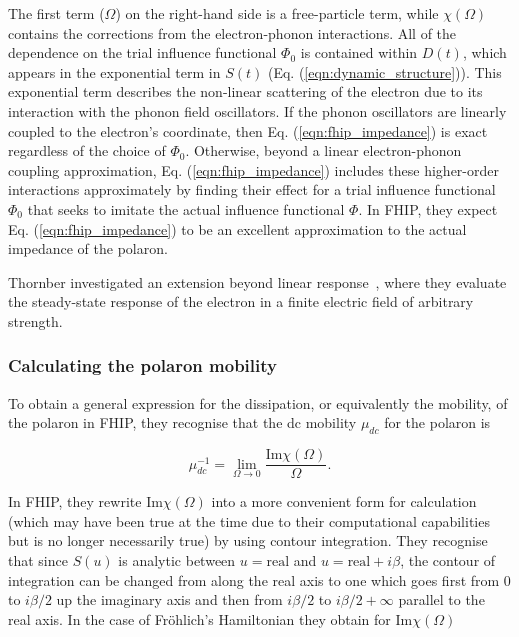 The first term ($\Omega$) on the right-hand side is a free-particle term, while $\chi(\Omega)$ contains the corrections from the electron-phonon interactions. All of the dependence on the trial influence functional $\Phi_0$ is contained within $D(t)$, which appears in the exponential term in $S(t)$ (Eq. (\ref{eqn:dynamic_structure})). This exponential term describes the non-linear scattering of the electron due to its interaction with the phonon field oscillators. If the phonon oscillators are linearly coupled to the electron's coordinate, then Eq. (\ref{eqn:fhip_impedance}) is exact regardless of the choice of $\Phi_0$. Otherwise, beyond a linear electron-phonon coupling approximation, Eq. (\ref{eqn:fhip_impedance}) includes these higher-order interactions approximately by finding their effect for a trial influence functional $\Phi_0$ that seeks to imitate the actual influence functional $\Phi$. In FHIP, they expect Eq. (\ref{eqn:fhip_impedance}) to be an excellent approximation to the actual impedance of the polaron. 

Thornber investigated an extension beyond linear response~\cite{thornber_velocity_1970}, where they evaluate the steady-state response of the electron in a finite electric field of arbitrary strength.

\subsubsection{Calculating the polaron mobility}
\label{subsubsec:2-3-1-4}

To obtain a general expression for the dissipation, or equivalently the mobility, of the polaron in FHIP, they recognise that the dc mobility $\mu_{dc}$ for the polaron is

\begin{equation}\label{eqn:FHIP_mobility}
    \mu^{-1}_{dc} = \lim_{\Omega \rightarrow 0} \frac{\textrm{Im}\chi(\Omega)}{\Omega}.
\end{equation}

In FHIP, they rewrite $\text{Im} \chi(\Omega)$ into a more convenient form for calculation (which may have been true at the time due to their computational capabilities but is no longer necessarily true) by using contour integration. They recognise that since $S(u)$ is analytic between $u = \text{real}$ and $u = \text{real} + i\beta$, the contour of integration can be changed from along the real axis to one which goes first from $0$ to $i\beta/2$ up the imaginary axis and then from $i\beta/2$ to $i\beta/2 + \infty$ parallel to the real axis. In the case of Fr\"ohlich's Hamiltonian they obtain for $\textrm{Im}\chi(\Omega)$

